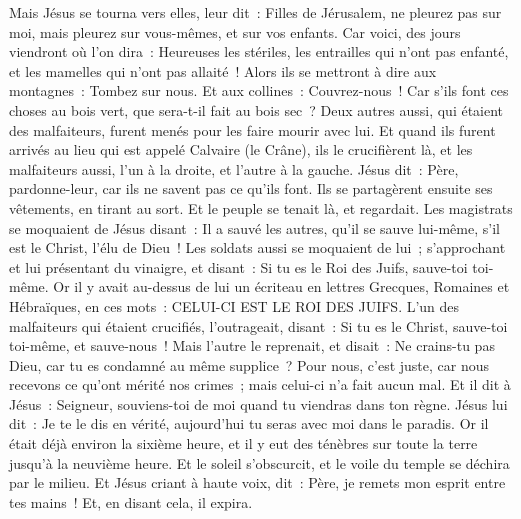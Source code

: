 \begin{multicols}{2}
Mais Jésus se tourna vers elles, leur dit~: Filles de Jérusalem, ne pleurez pas sur moi, mais pleurez sur vous-mêmes, et sur vos enfants.
Car voici, des jours viendront où l'on dira~: Heureuses les stériles, les entrailles qui n'ont pas enfanté, et les mamelles qui n'ont pas allaité~!
Alors ils se mettront à dire aux montagnes~: Tombez sur nous. Et aux collines~: Couvrez-nous~!
Car s'ils font ces choses au bois vert, que sera-t-il fait au bois sec~?
Deux autres aussi, qui étaient des malfaiteurs, furent menés pour les faire mourir avec lui.
Et quand ils furent arrivés au lieu qui est appelé Calvaire (le Crâne), ils le crucifièrent là, et les malfaiteurs aussi, l'un à la droite, et l'autre à la gauche.
Jésus dit~: Père, pardonne-leur, car ils ne savent pas ce qu'ils font. Ils se partagèrent ensuite ses vêtements, en tirant au sort.
Et le peuple se tenait là, et regardait. Les magistrats se moquaient de Jésus disant~: Il a sauvé les autres, qu'il se sauve lui-même, s'il est le Christ, l'élu de Dieu~!
Les soldats aussi se moquaient de lui~; s'approchant et lui présentant du vinaigre,
et disant~: Si tu es le Roi des Juifs, sauve-toi toi-même.
Or il y avait au-dessus de lui un écriteau en lettres Grecques, Romaines et Hébraïques, en ces mots~: CELUI-CI EST LE ROI DES JUIFS.
L'un des malfaiteurs qui étaient crucifiés, l'outrageait, disant~: Si tu es le Christ, sauve-toi toi-même, et sauve-nous~!
Mais l'autre le reprenait, et disait~: Ne crains-tu pas Dieu, car tu es condamné au même supplice~?
Pour nous, c'est juste, car nous recevons ce qu'ont mérité nos crimes~; mais celui-ci n'a fait aucun mal.
Et il dit à Jésus~: Seigneur, souviens-toi de moi quand tu viendras dans ton règne.
Jésus lui dit~: Je te le dis en vérité, aujourd'hui tu seras avec moi dans le paradis.
Or il était déjà environ la sixième heure, et il y eut des ténèbres sur toute la terre jusqu'à la neuvième heure.
Et le soleil s'obscurcit, et le voile du temple se déchira par le milieu.
Et Jésus criant à haute voix, dit~: Père, je remets mon esprit entre tes mains~! Et, en disant cela, il expira.

\end{multicols}

